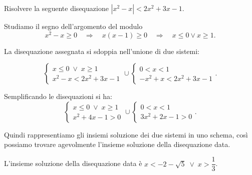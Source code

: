 \begin{exrig}
\begin{esempio}
Risolvere la seguente disequazione $\left|x^2-x\right|<2x^2+3x-1$.

Studiamo il segno dell'argomento del modulo 
\[x^2-x\ge 0 \quad\Rightarrow\quad x(x-1)\ge 0 \quad\Rightarrow\quad x\le 0\vee x\ge 1.\]

La disequazione assegnata si sdoppia nell'unione di due sistemi:

\[\left\{\begin{array}{l}{x\le 0\;\vee\; x\ge 1}\\{x^2-x<2x^2+3x-1}\end{array}\right.\cup \left\{\begin{array}{l}{0<x<1}\\{-x^2+x<2x^2+3x-1}\end{array}\right..\]

 Semplificando le disequazioni si ha:
\begin{equation*}
\left\{\begin{array}{l}{x\le 0\;\vee\; x\ge 1}\\{x^2+4x-1>0}\end{array}\right.\cup \left\{\begin{array}{l}{0<x<1}\\{3x^2+2x-1>0}\end{array}\right..
\end{equation*}

Quindi rappresentiamo gli insiemi soluzione dei due sistemi in uno schema, così possiamo trovare agevolmente l'insieme soluzione della disequazione data.

\begin{center}

\end{center}

L'insieme soluzione della disequazione data è $x<-2-\sqrt 5\;\vee\; x>\dfrac 1 3$.
\end{esempio}
\end{exrig}

